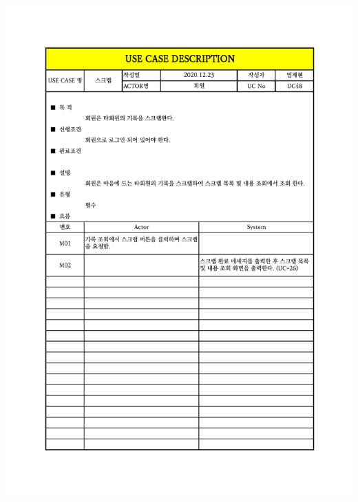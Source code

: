 {{{{{{{{{{{{{{{{{{{{{{{{{{{{{{{{{{{{{{{{{{{{{{{{{{{\includegraphics[width=1.1\textwidth]{./Figure/Design/Display/usecase/048.pdf} \\
}}}}}}}}}}}}}}}}}}}}}}}}}}}}}}}}}}}}}}}}}}}}}}}}}}}
